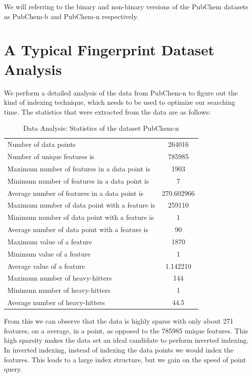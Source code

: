 We will referring to the binary and non-binary versions of the PubChem datasets as PubChem-b and PubChem-n respectively.



\section{A Typical Fingerprint Dataset Analysis}
We perform a detailed analysis of the data from  PubChem-n to figure out the kind of indexing technique, which needs to be used to optimize our searching time. The statistics that were extracted from the data are as follows:\\

\begin{table}[ht!]
\centering
\caption{Data Analysis: Statistics of the dataset PubChem-n}
\begin{tabular}{|l|c|}
\hline 
Number of data points & 264016 \\ 
Number of unique features is & 785985 \\ 
Maximum number of features in a data point is & 1903 \\ 
Minimum number of features in a data point is  & 7 \\ 
Average number of features in a data point is & 270.602966 \\ 
Maximum number of data point with a feature is & 259110 \\ 
Minimum number of data point with a feature is & 1 \\ 
Average number of data point with a feature is & 90
 \\ 
Maximum value of a feature  & 1870 \\ 
Minimum value of a feature
 & 1 \\ 
Average value of a feature & 1.142210 \\ 
Maximum number of heavy-hitters  & 144 \\ 
Minimum number of heavy-hitters  & 1 \\ 
 Average number of heavy-hitters  & 44.5 \\ 
\hline 
\end{tabular} 
\end{table}

From this we can observe that the data is highly sparse with only about 271 features, on a average, in a point, as opposed to the 785985 unique features. This high sparsity makes the data set an ideal candidate to perform inverted indexing. In inverted indexing, instead of indexing the data points we would index the features. This leads to a large index structure, but we gain on the speed of point query. \\

